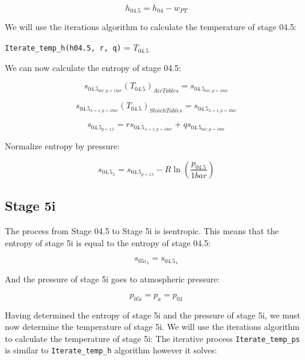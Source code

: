 \documentclass[titlepage]{article}
\begin{document}
    \begin{equation}
        h_{04.5} = h_{04} - w_{PT}
    \end{equation}

    We will use the iterations algorithm to calculate the temperature of stage 04.5:

    \begin{center}
        \verb|Iterate_temp_h(h04.5, r, q)| = $T_{04.5}$
    \end{center}

    We can now calculate the entropy of stage 04.5:

    \begin{equation}
        s_{04.5_{air, p= 1 bar}}(T_{04.5})_{Air Tables} = s_{04.5_{air, p=1 bar}}
    \end{equation}

    \begin{equation}
        s_{04.5_{\lambda=1, p= 1 bar}}(T_{04.5})_{Stoich  Tables} = s_{04.5_{\lambda=1, p = 1 bar}}
    \end{equation}

    \begin{equation}
        s_{04.5_{p=1 \lambda}} = r s_{04.5_{\lambda=1, p=1 bar}} + q s_{04.5_{air, p=1 bar}}
    \end{equation}

    Normalize entropy by pressure:

    \begin{equation}
        s_{04.5_{\lambda}} = s_{04.5_{p=1 \lambda}} - R \ln \left( \frac{p_{04.5}}{1 bar} \right)
    \end{equation}


    \subsection{Stage 5i}
    The process from Stage 04.5 to Stage 5i is isentropic. This means that the entropy of stage 5i is equal to the entropy of stage 04.5:

    \begin{equation}
        s_{05i_{\lambda}} = s_{04.5_{\lambda}}
    \end{equation}

    And the pressure of stage 5i goes to atmospheric pressure:

    \begin{equation}
        p_{05i} = p_{a} = p_{01}
    \end{equation}

    Having determined the entropy of stage 5i and the pressure of stage 5i, we must now determine the temperature of stage 5i. We will use the iterations algorithm to calculate the temperature of stage 5i:
    The iterative process \verb|Iterate_temp_ps| is similar to \verb|Iterate_temp_h| algorithm however it solves:
\end{document}
